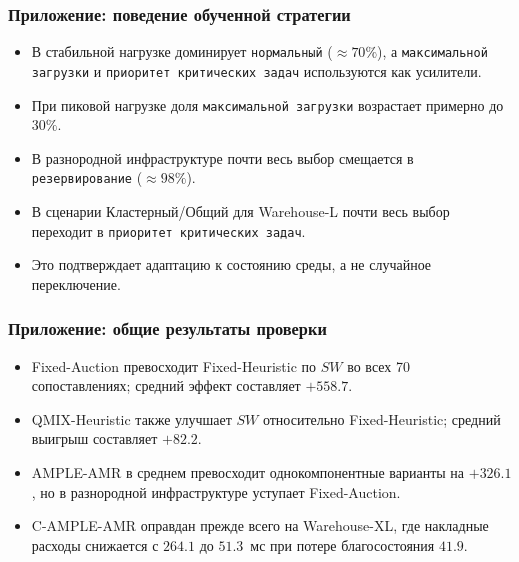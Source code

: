 \begin{frame}
	\frametitle{Приложение: поведение обученной стратегии}
	\small
	\begin{center}
	\end{center}
	\begin{itemize}
		\item В стабильной нагрузке доминирует \texttt{нормальный} ($\approx 70\%$), а \texttt{максимальной загрузки} и \texttt{приоритет критических задач} используются как усилители.
		\item При пиковой нагрузке доля \texttt{максимальной загрузки} возрастает примерно до $30\%$.
		\item В разнородной инфраструктуре почти весь выбор смещается в \texttt{резервирование} ($\approx 98\%$).
		\item В сценарии Кластерный/Общий для Warehouse-L почти весь выбор переходит в \texttt{приоритет критических задач}.
		\item Это подтверждает адаптацию к состоянию среды, а не случайное переключение.
	\end{itemize}
\end{frame}

\begin{frame}
	\frametitle{Приложение: общие результаты проверки}
	\small
	\begin{itemize}
		\item Fixed-Auction превосходит Fixed-Heuristic по $SW$ во всех 70 сопоставлениях; средний эффект составляет $+558.7$.
		\item QMIX-Heuristic также улучшает $SW$ относительно Fixed-Heuristic; средний выигрыш составляет $+82.2$.
		\item AMPLE-AMR в среднем превосходит однокомпонентные варианты на $+326.1$, но в разнородной инфраструктуре уступает Fixed-Auction.
		\item C-AMPLE-AMR оправдан прежде всего на Warehouse-XL, где накладные расходы снижается с $264.1$ до $51.3$~мс при потере благосостояния $41.9$.
	\end{itemize}
\end{frame}

